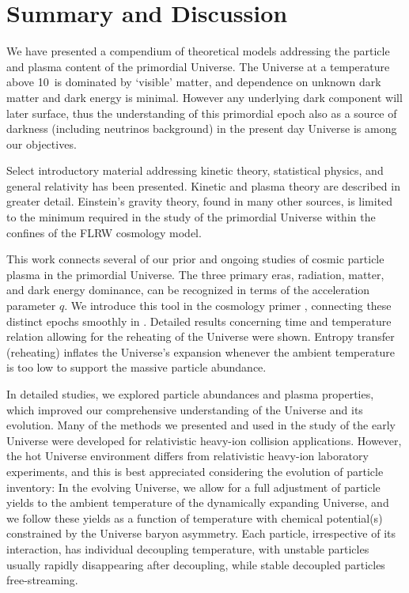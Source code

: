 \section{Summary and Discussion}\label{ part6}
We have presented a compendium of theoretical models addressing the particle and plasma content of the primordial Universe. The Universe at a temperature above 10\keV\ is dominated by `visible' matter, and dependence on unknown dark matter and dark energy is minimal. However any underlying dark component will later surface, thus the understanding of this primordial epoch also as a source of darkness (including neutrinos background) in the present day Universe is among our objectives.

Select introductory material addressing kinetic theory, statistical physics, and general relativity has been presented. Kinetic and plasma theory are described in greater detail. Einstein's gravity theory, found in many other sources, is limited to the minimum required in the study of the primordial Universe within the confines of the FLRW cosmology model. 

This work connects several of our prior and ongoing studies of cosmic particle plasma in the primordial Universe. The three primary eras, radiation, matter, and dark energy dominance, can be recognized in terms of the acceleration parameter $q$. We introduce this tool in the cosmology primer , connecting these distinct epochs smoothly in . Detailed results concerning time and temperature relation allowing for the reheating of the Universe were shown. Entropy transfer (reheating) inflates the Universe's expansion whenever the ambient temperature is too low to support the massive particle abundance.

In detailed studies, we explored particle abundances and plasma properties, which improved our comprehensive understanding of the Universe and its evolution. {\color{black} Many of the methods we presented and used in the study of the early Universe were developed for relativistic heavy-ion collision applications. However, the hot Universe environment differs from relativistic heavy-ion laboratory experiments, and this is best appreciated considering the evolution of particle inventory: In the evolving Universe, we allow for a full adjustment of particle yields to the ambient temperature of the dynamically expanding Universe, and we follow these yields as a function of temperature with chemical potential(s) constrained by the Universe baryon asymmetry. Each particle, irrespective of its interaction, has individual decoupling temperature, with unstable particles usually rapidly disappearing after decoupling, while stable decoupled particles free-streaming.} 

